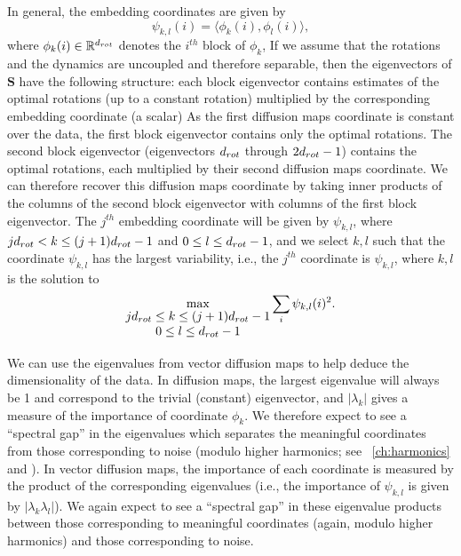 In general, the embedding coordinates are given by
\begin{equation} \label{eq:vdm_coord}
\psi_{k,l} (i) = \langle \phi_k(i), \phi_l(i) \rangle,
\end{equation}
where $\phi_k(i) \in \mathbb{R}^{d_{rot}}$ denotes the $i^{th}$ block of $\phi_k$,
%
If we assume that the rotations and the dynamics are uncoupled and therefore separable, then the eigenvectors of $\mathbf{S}$ have the following structure: each block eigenvector contains estimates of the optimal rotations (up to a constant rotation) multiplied by the corresponding embedding coordinate (a scalar)
%
As the first diffusion maps coordinate is constant over the data, the first block eigenvector contains only the optimal rotations.
%
The second block eigenvector (eigenvectors $d_{rot}$ through $2d_{rot}-1$) contains the optimal rotations, each multiplied by their second diffusion maps coordinate.
%
We can therefore recover this diffusion maps coordinate by taking inner products of the columns of the second block eigenvector with columns of the first block eigenvector.
%
The $j^{th}$ embedding coordinate will be given by $\psi_{k,l}$, where $jd_{rot}  < k \le (j+1)d_{rot}-1$ and $0 \le l \le d_{rot}-1$,
and we select $k, l$ such that the coordinate $\psi_{k, l}$ has the largest variability, i.e., the $j^{th}$ coordinate is $\psi_{k,l}$, where $k, l$ is the solution to
\begin{equation} \label{eq:first_embed_vdm}
\max_{
\begin{matrix}
jd_{rot} \le k \le (j+1)d_{rot}-1 \\
0 \le l \le d_{rot}-1
\end{matrix}}
 \sum_i \psi_{k,l} (i)^2. 
\end{equation}


We can use the eigenvalues from vector diffusion maps to help deduce the dimensionality of the data.
%
In diffusion maps, the largest eigenvalue will always be 1 and correspond to the trivial (constant) eigenvector, and $|\lambda_k|$ gives a measure of the importance of coordinate $\phi_k$. 
%
We therefore expect to see a ``spectral gap'' in the eigenvalues which separates the meaningful coordinates from those corresponding to noise (modulo higher harmonics; see \chap~\ref{ch:harmonics} and \citep{ferguson2010systematic}).
%
In vector diffusion maps, the importance of each coordinate is measured by the product of the corresponding eigenvalues (i.e., the importance of $\psi_{k,l}$ is given by $| \lambda_k \lambda_l |$). 
%
We again expect to see a ``spectral gap'' in these eigenvalue products between those corresponding to meaningful coordinates (again, modulo higher harmonics) and those corresponding to noise. 